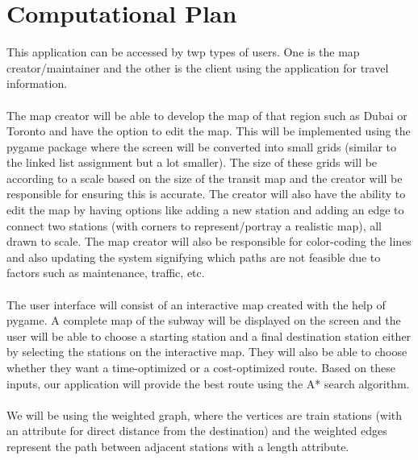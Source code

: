 \documentclass[fontsize=11pt]{article}
\begin{document}
\section*{Computational Plan}
This application can be accessed by twp types of users. One is the map creator/maintainer and the other is the client using the application for travel information.\\
\\
The map creator will be able to develop the map of that region such as Dubai or Toronto and have the option to edit the map. This will be implemented using the pygame package where the screen will be converted into small grids (similar to the linked list assignment but a lot smaller). The size of these grids will be according to a scale based on the size of the transit map and the creator will be responsible for ensuring this is accurate. The creator will also have the ability to edit the map by having options like adding a new station and adding an edge to connect two stations (with corners to represent/portray a realistic map), all drawn to scale. The map creator will also be responsible for color-coding the lines and also updating the system signifying which paths are not feasible due to factors such as maintenance, traffic, etc. \\
\\
The user interface will consist of an interactive map created with the help of pygame. A complete map of the subway will be displayed on the screen and the user will be able to choose a starting station and a final destination station either by selecting the stations on the interactive map. They will also be able to choose whether they want a time-optimized or a cost-optimized route. Based on these inputs, our application will provide the best route using the A* search algorithm.\\
 \\
We will be using the weighted graph, where the vertices are train stations (with an attribute for direct distance from the destination) and the weighted edges represent the path between adjacent stations with a length attribute. \\
\\
\end{document}
